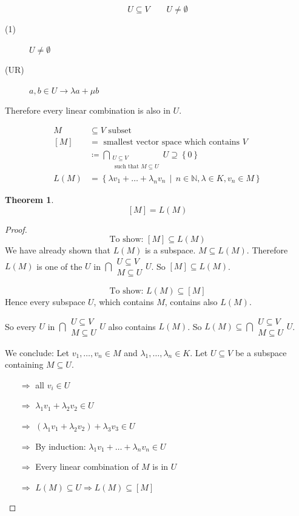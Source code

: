 \documentclass[a4paper,landscape,twocolumn]{article}
\newcommand\set[1]{\left\{#1\right\}}
\newcommand\setdef[2]{\left\{#1\,\middle|\,#2\right\}}
\newtheorem{theorem}{Theorem}
\begin{document}
\[ U \subseteq V \qquad U \neq \emptyset \]
\begin{description}
  \item[(1)] $U \neq \emptyset$
  \item[(UR)] $a, b \in U \rightarrow \lambda a + \mu b$
\end{description}

Therefore every linear combination is also in $U$.

\begin{align*}
    M &\subseteq V \text{ subset} \\
  [M] &= \text{ smallest vector space which contains } V \\
      &\coloneqq \bigcap_{\substack{U \subseteq V \\ \text{ such that } M \subseteq U} } U \supseteq \set{0} \\
 L(M) &= \setdef{\lambda v_1 + \ldots + \lambda_n v_n}{n \in \mathbb N, \lambda \in K, v_n \in M}
\end{align*}

\begin{theorem}
  \[ [M] = L(M) \]
\end{theorem}

\begin{proof}
  \[ \text{To show: } [M] \subseteq L(M) \]
  We have already shown that $L(M)$ is a subspace. $M \subseteq L(M)$.
  Therefore $L(M)$ is one of the $U$ in $\bigcap{\substack{U \subseteq V \\ M \subseteq U}} U$.
  So $[M] \subseteq L(M)$.

  \[ \text{To show: } L(M) \subseteq [M] \]
  Hence every subspace $U$, which contains $M$, contains also $L(M)$.

  So every $U$ in $\bigcap{\substack{U \subseteq V \\ M \subseteq U}} U$ also contains $L(M)$.
  So $L(M) \subseteq \bigcap{\substack{U \subseteq V \\ M \subseteq U}} U$.

  We conclude: Let $v_1, \ldots, v_n \in M$ and $\lambda_1, \ldots, \lambda_n \in K$.
  Let $U \subseteq V$ be a subspace containing $M \subseteq U$.

  \begin{itemize}
    \item[$\Rightarrow$]
      all $v_i \in U$
    \item[$\Rightarrow$]
      $\lambda_1 v_1 + \lambda_2 v_2 \in U$
    \item[$\Rightarrow$]
      $(\lambda_1 v_1 + \lambda_2 v_2) + \lambda_3 v_3 \in U$
    \item[$\Rightarrow$]
      By induction: $\lambda_1 v_1 + \ldots + \lambda_n v_n \in U$
    \item[$\Rightarrow$]
      Every linear combination of $M$ is in $U$
    \item[$\Rightarrow$]
      $L(M) \subseteq U \Rightarrow L(M) \subseteq [M]$
  \end{itemize}
\end{proof}
\end{document}
